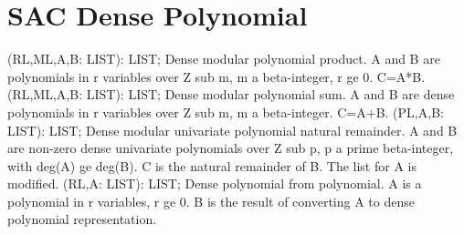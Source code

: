 \section{ SAC Dense Polynomial  } 
 (RL,ML,A,B: LIST): LIST; \eproc
\bcom Dense modular polynomial product. A and B are polynomials in r
variables over Z sub m, m a beta-integer, r ge 0. C=A*B. \ecom 
{} (RL,ML,A,B: LIST): LIST; \eproc
\bcom Dense modular polynomial sum. A and B are dense polynomials in r
variables over Z sub m, m a beta-integer. C=A+B. \ecom 
{} (PL,A,B: LIST): LIST; \eproc
\bcom Dense modular univariate polynomial natural remainder. A and B are
non-zero dense univariate polynomials over Z sub p, p a prime
beta-integer, with deg(A) ge deg(B).  C is the natural remainder of B.
The list for A is modified. \ecom 
{} (RL,A: LIST): LIST; \eproc
\bcom Dense polynomial from polynomial. A is a polynomial in r
variables, r ge 0.  B is the result of converting A to dense
polynomial representation. \ecom 
